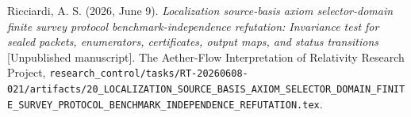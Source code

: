 \documentclass[11pt]{article}
\begin{document}
Ricciardi, A. S. (2026, June 9). \emph{Localization source-basis axiom
selector-domain finite survey protocol benchmark-independence refutation:
Invariance test for sealed packets, enumerators, certificates, output maps,
and status transitions} [Unpublished manuscript]. The Aether-Flow
Interpretation of Relativity Research Project,
\texttt{research\_control/tasks/RT-20260608-021/artifacts/20\_LOCALIZATION\_SOURCE\_BASIS\_AXIOM\_SELECTOR\_DOMAIN\_FINITE\_SURVEY\_PROTOCOL\_BENCHMARK\_INDEPENDENCE\_REFUTATION.tex}.
\end{document}
